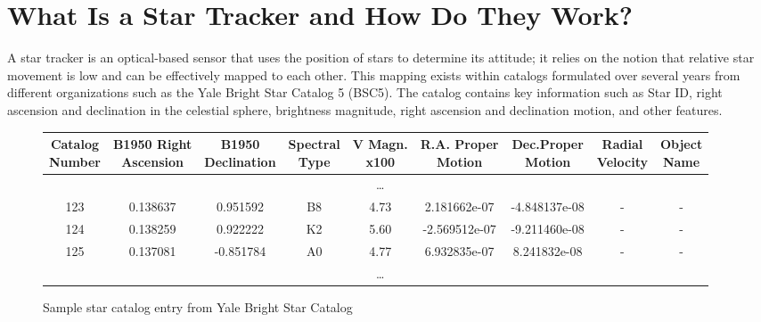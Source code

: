 \section*{What Is a Star Tracker and How Do They Work?}
\par \qquad A star tracker is an optical-based sensor that uses the position of stars to determine its attitude; it relies on the notion that relative star movement is low and can be effectively mapped to each other.
This mapping exists within catalogs formulated over several years from different organizations such as the Yale Bright Star Catalog 5 (BSC5). 
The catalog contains key information such as Star ID, right ascension and declination in the celestial sphere, brightness magnitude, right ascension and declination motion, and other features.

\begin{figure}[h]
    \begin{adjustbox}{center}
\begin{tabular}{|| c c c c c c c c c ||}
    \hline
    \thead{Catalog\\Number} & \thead{B1950 Right\\Ascension} & \thead{B1950\\Declination} & \thead{Spectral\\Type} & \thead{V Magn.\\ x100} & \thead{R.A. Proper\\Motion} & \thead{Dec.Proper\\Motion} & \thead{Radial\\Velocity} & \thead{Object\\Name} \\ [0.5ex] 
    \hline\hline

    & & & & \dots & & & & \\ 
    \hline
    123 & 0.138637 & 0.951592 & B8 & 4.73 & 2.181662e-07 & -4.848137e-08 & - & - \\
    \hline
    124 & 0.138259 & 0.922222 & K2 & 5.60 & -2.569512e-07 & -9.211460e-08 & - & - \\
    \hline
    125 & 0.137081 & -0.851784 & A0 & 4.77 & 6.932835e-07 & 8.241832e-08 & - & - \\
    \hline
    & & & & \dots & & & & \\ 
    \hline

\end{tabular}
\end{adjustbox}
\caption{Sample star catalog entry from Yale Bright Star Catalog}
\end{figure}

